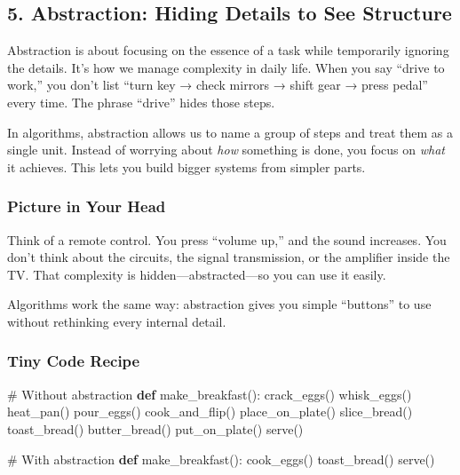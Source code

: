 \documentclass[
  letterpaper,
  DIV=11,
  numbers=noendperiod]{scrreprt}
\newenvironment{Shaded}{\begin{snugshade}}{\end{snugshade}}
\newcommand{\CommentTok}[1]{\textcolor[rgb]{0.37,0.37,0.37}{#1}}
\newcommand{\KeywordTok}[1]{\textcolor[rgb]{0.00,0.23,0.31}{\textbf{#1}}}
\newcommand{\NormalTok}[1]{\textcolor[rgb]{0.00,0.23,0.31}{#1}}
\begin{document}
\subsection{5. Abstraction: Hiding Details to See
Structure}\label{abstraction-hiding-details-to-see-structure}

Abstraction is about focusing on the essence of a task while temporarily
ignoring the details. It's how we manage complexity in daily life. When
you say ``drive to work,'' you don't list ``turn key → check mirrors →
shift gear → press pedal'' every time. The phrase ``drive'' hides those
steps.

In algorithms, abstraction allows us to name a group of steps and treat
them as a single unit. Instead of worrying about \emph{how} something is
done, you focus on \emph{what} it achieves. This lets you build bigger
systems from simpler parts.

\subsubsection{Picture in Your Head}\label{picture-in-your-head-4}

Think of a remote control. You press ``volume up,'' and the sound
increases. You don't think about the circuits, the signal transmission,
or the amplifier inside the TV. That complexity is
hidden---abstracted---so you can use it easily.

Algorithms work the same way: abstraction gives you simple ``buttons''
to use without rethinking every internal detail.

\subsubsection{Tiny Code Recipe}\label{tiny-code-recipe-4}

\begin{Shaded}
\begin{Highlighting}[]
\CommentTok{\# Without abstraction}
\KeywordTok{def}\NormalTok{ make\_breakfast():}
\NormalTok{    crack\_eggs()}
\NormalTok{    whisk\_eggs()}
\NormalTok{    heat\_pan()}
\NormalTok{    pour\_eggs()}
\NormalTok{    cook\_and\_flip()}
\NormalTok{    place\_on\_plate()}
\NormalTok{    slice\_bread()}
\NormalTok{    toast\_bread()}
\NormalTok{    butter\_bread()}
\NormalTok{    put\_on\_plate()}
\NormalTok{    serve()}

\CommentTok{\# With abstraction}
\KeywordTok{def}\NormalTok{ make\_breakfast():}
\NormalTok{    cook\_eggs()}
\NormalTok{    toast\_bread()}
\NormalTok{    serve()}
\end{Highlighting}
\end{Shaded}
\end{document}
